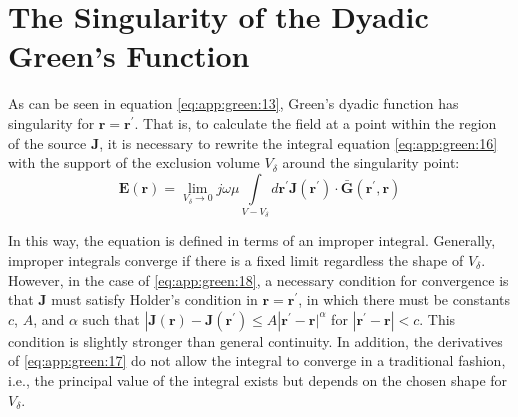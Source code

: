 		\section{The Singularity of the Dyadic Green's Function}\label{app:green:2}
		
			As can be seen in equation \eqref{eq:app:green:13}, Green's dyadic function has singularity for $\mathbf{r}=\mathbf{r^\prime}$. That is, to calculate the field at a point within the region of the source $\mathbf{J}$, it is necessary to rewrite the integral equation \eqref{eq:app:green:16} with the support of the exclusion volume $V_\delta$ around the singularity point:
			\begin{equation}
				\mathbf{E}(\mathbf{r}) = \lim\limits_{V_\delta\rightarrow0} j\omega\mu\int\limits_{V-V_\delta} d\mathbf{r^\prime} \mathbf{J}(\mathbf{r^\prime})\cdot\mathbf{\bar{G}}(\mathbf{r^\prime},\mathbf{r}) \label{eq:app:green:18}
			\end{equation}
		
			In this way, the equation is defined in terms of an improper integral. Generally, improper integrals converge if there is a fixed limit regardless the shape of $V_\delta$. However, in the case of \eqref{eq:app:green:18}, a necessary condition for convergence is that $\mathbf{J}$ must satisfy Holder's condition \citep{kellogg1953foundations} in $\mathbf{r}=\mathbf{r^\prime}$, in which there must be constants $c$, $A$, and $\alpha$ such that $|\mathbf{J}(\mathbf{r})-\mathbf{J}(\mathbf{r^\prime})\le A|\mathbf{r^\prime}-\mathbf{r}|^{\alpha}$ for $|\mathbf{r^\prime}-\mathbf{r}| < c$. This condition is slightly stronger than general continuity. In addition, the derivatives of \eqref{eq:app:green:17} do not allow the integral to converge in a traditional fashion, i.e., the principal value of the integral exists but depends on the chosen shape for $V_\delta$.
			
